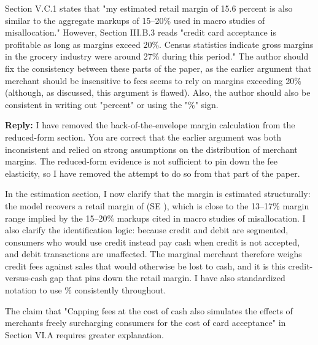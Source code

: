 \documentclass[main.tex]{subfiles}
\begin{document}
\begin{refsection}
\begin{refcommentnoclear}
Section V.C.1 states that "my estimated retail margin of 15.6 percent is also similar to the aggregate markups of 15–20\% used in macro studies of misallocation." However, Section III.B.3 reads "credit card acceptance is profitable as long as margins exceed 20\%.
Census statistics indicate gross margins in the grocery industry were around 27\% during this period." The author should fix the consistency between these parts of the paper, as the earlier argument that merchant should be insensitive to fees seems to rely on margins exceeding 20\% (although, as discussed, this argument is flawed).
Also, the author should also be consistent in writing out "percent" or using the "\%" sign.

\end{refcommentnoclear}

\textbf{Reply:} I have removed the back-of-the-envelope margin calculation from the reduced-form section.
You are correct that the earlier argument was both inconsistent and relied on strong assumptions on the distribution of merchant margins.
The reduced-form evidence is not sufficient to pin down the fee elasticity, so I have removed the attempt to do so from that part of the paper.

In the estimation section, I now clarify that the margin is estimated structurally: the model recovers a retail margin of  (SE ), which is close to the 13--17\% margin range implied by the 15--20\% markups cited in macro studies of misallocation.
I also clarify the identification logic: because credit and debit are segmented, consumers who would use credit instead pay cash when credit is not accepted, and debit transactions are unaffected.
The marginal merchant therefore weighs credit fees against sales that would otherwise be lost to cash, and it is this credit-versus-cash gap that pins down the retail margin.
I have also standardized notation to use \% consistently throughout.

\begin{refcommentnoclear}
The claim that "Capping fees at the cost of cash also simulates the effects of merchants freely surcharging consumers for the cost of card acceptance" in Section VI.A requires greater explanation.
\end{refcommentnoclear}


\end{refsection}
\end{document}
